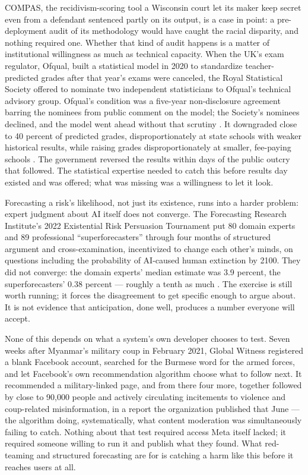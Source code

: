COMPAS, the recidivism-scoring tool a Wisconsin court let its maker keep secret even from a defendant sentenced partly on its output, is a case in point: a pre-deployment audit of its methodology would have caught the racial disparity, and nothing required one. Whether that kind of audit happens is a matter of institutional willingness as much as technical capacity. When the UK's exam regulator, Ofqual, built a statistical model in 2020 to standardize teacher-predicted grades after that year's exams were canceled, the Royal Statistical Society offered to nominate two independent statisticians to Ofqual's technical advisory group. Ofqual's condition was a five-year non-disclosure agreement barring the nominees from public comment on the model; the Society's nominees declined, and the model went ahead without that scrutiny \autocite{rss2020ofqual}. It downgraded close to 40 percent of predicted grades, disproportionately at state schools with weaker historical results, while raising grades disproportionately at smaller, fee-paying schools \autocite{cnbc2020ofqual}. The government reversed the results within days of the public outcry that followed. The statistical expertise needed to catch this before results day existed and was offered; what was missing was a willingness to let it look.

Forecasting a risk's likelihood, not just its existence, runs into a harder problem: expert judgment about AI itself does not converge. The Forecasting Research Institute's 2022 Existential Risk Persuasion Tournament put 80 domain experts and 89 professional “superforecasters” through four months of structured argument and cross-examination, incentivized to change each other's minds, on questions including the probability of AI-caused human extinction by 2100. They did not converge: the domain experts' median estimate was 3.9 percent, the superforecasters' 0.38 percent — roughly a tenth as much \autocite{karger2023existential}. The exercise is still worth running; it forces the disagreement to get specific enough to argue about. It is not evidence that anticipation, done well, produces a number everyone will accept.

None of this depends on what a system's own developer chooses to test. Seven weeks after Myanmar's military coup in February 2021, Global Witness registered a blank Facebook account, searched for the Burmese word for the armed forces, and let Facebook's own recommendation algorithm choose what to follow next. It recommended a military-linked page, and from there four more, together followed by close to 90,000 people and actively circulating incitements to violence and coup-related misinformation, in a report the organization published that June \autocite{globalwitness2021algorithm} — the algorithm doing, systematically, what content moderation was simultaneously failing to catch. Nothing about that test required access Meta itself lacked; it required someone willing to run it and publish what they found. What red-teaming and structured forecasting are for is catching a harm like this before it reaches users at all.
